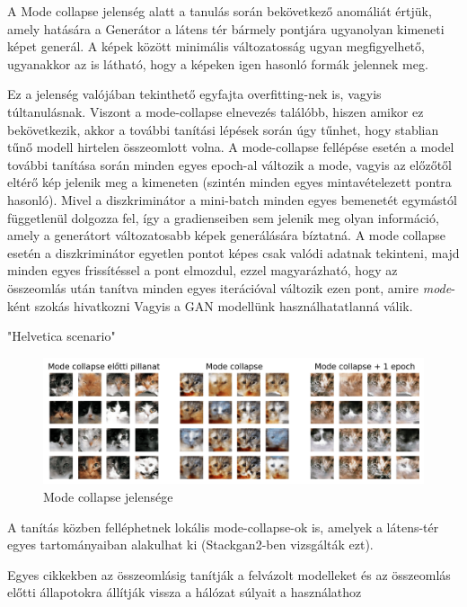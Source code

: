 
A Mode collapse jelenség alatt a tanulás során bekövetkező anomáliát értjük, amely hatására a Generátor a látens tér bármely pontjára ugyanolyan kimeneti képet generál. A képek között minimális változatosság ugyan megfigyelhető, ugyanakkor az is látható, hogy a képeken igen hasonló formák jelennek meg.

Ez a jelenség valójában tekinthető egyfajta overfitting-nek is, vagyis túltanulásnak. Viszont a mode-collapse elnevezés találóbb, hiszen amikor ez bekövetkezik, akkor a további tanítási lépések során úgy tűnhet, hogy stablian tűnő modell hirtelen összeomlott volna.
A mode-collapse fellépése esetén a model további tanítása során minden egyes epoch-al változik a mode, vagyis az előzőtől eltérő kép jelenik meg a kimeneten (szintén minden egyes mintavételezett pontra hasonló). Mivel a diszkriminátor a mini-batch minden egyes bemenetét egymástól függetlenül dolgozza fel, így a gradienseiben sem jelenik meg olyan információ, amely a generátort változatosabb képek generálására bíztatná. A mode collapse esetén a diszkriminátor egyetlen pontot képes csak valódi adatnak tekinteni, majd minden egyes frissítéssel a pont elmozdul, ezzel magyarázható, hogy az összeomlás után tanítva minden egyes iterációval változik ezen pont, amire \textit{mode}-ként szokás hivatkozni \cite{salimans2016improved} Vagyis a GAN modellünk használhatatlanná válik.

"Helvetica scenario" %

\begin{figure}[h]
	\centering
	\includegraphics[width=15cm]{images/mode-collapse.png}
	\caption{Mode collapse jelensége}
	\label{fig:mode-collapse}
\end{figure}

A tanítás közben felléphetnek lokális mode-collapse-ok is, amelyek a látens-tér egyes tartományaiban alakulhat ki (Stackgan2-ben vizsgálták ezt).

Egyes cikkekben az összeomlásig tanítják a felvázolt modelleket és az összeomlás előtti állapotokra állítják vissza a hálózat súlyait a használathoz \cite{brock2018large}

